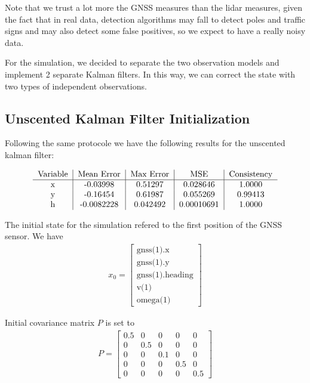 \documentclass[conference]{IEEEtran}
\begin{document}
\noindent Note that we trust a lot more the GNSS measures than the lidar measures, given the fact that in real data, detection algorithms may fall to detect poles and traffic signs and may also detect some false positives, so we expect to have a really noisy data.

\noindent For the simulation, we decided to separate the two observation models and implement 2 separate Kalman filters. In this way, we can correct the state with two types of independent observations.


\subsection{Unscented Kalman Filter Initialization}

Following the same protocole we have the following results for the unscented kalman filter:

\begin{align*}
\begin{tabular}{c|c|c|c|c} 
  Variable & Mean Error & Max Error & MSE & Consistency \\ \hline 
  x & -0.03998 & 0.51297 & 0.028646 & 1.0000 \\
  y   & -0.16454 & 0.61987 &  0.055269 & 0.99413\\
    h   & -0.0082228 & 0.042492 &  0.00010691 & 1.0000\\
\end{tabular}
\end{align*}


The initial state for the simulation refered to the first position of the GNSS sensor. We have \begin{align*}
   x_0 = \begin{bmatrix}
    \text{gnss(1).x} \\ 
    \text{gnss(1).y} \\
    \text{gnss(1).heading} \\
    \text{v(1)} \\
    \text{omega(1)}
    \end{bmatrix}
\end{align*}

\noindent Initial covariance matrix $P$ is set to
\begin{align*}
   P = \begin{bmatrix}
    0.5 & 0 & 0 & 0 & 0 \\ 
    0 & 0.5 & 0 & 0 & 0 \\
    0 & 0 & 0.1 & 0 & 0 \\
    0 & 0 & 0 & 0.5 & 0 \\
    0 & 0 & 0 & 0 & 0.5
    \end{bmatrix}
\end{align*}
\end{document}
